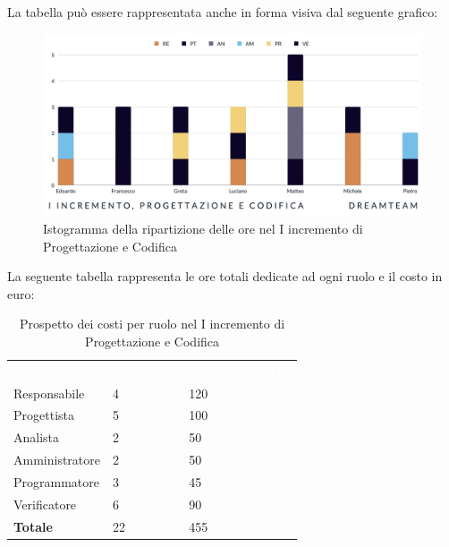 La tabella può essere rappresentata anche in forma visiva dal seguente grafico:
\begin{figure}[H]
\centering
\includegraphics[scale=0.55]{Sezioni/SezioniPreventivo/grafici/Preventivo_progettazione_I.png}
\caption{Istogramma della ripartizione delle ore nel I incremento di Progettazione e Codifica}
\end{figure}

La seguente tabella rappresenta le ore totali dedicate ad ogni ruolo e il costo in euro:

\begin{table}[H]
\begin{center}
\renewcommand{\arraystretch}{1.5}
\begin{tabular}{ m{}<{\centering}  m{}<{\centering} m{}<{\centering}}
	\rowcolor{darkblue}
	\textcolor{white}{\textbf{Ruolo}}&\textcolor{white}{\textbf{Totale ore}}&\textcolor{white}{\textbf{Costo totale (\euro)}}\\ 

	Responsabile  & 4 & 120 \\	
	
	Progettista & 5 & 100 \\
	
	Analista & 2 & 50 \\

	Amministratore & 2 & 50 \\
	
	Programmatore & 3 & 45 \\
	
	Verificatore & 6 & 90 \\
	
	\textbf{Totale} & 22 & 455 \\
	
\end{tabular}
\caption{Prospetto dei costi per ruolo nel I incremento di Progettazione e Codifica}
\end{center}
\end{table}

